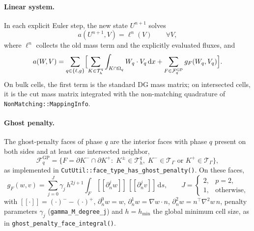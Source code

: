 \documentclass[11pt,a4paper]{article}
\newcommand{\Th}{\mathcal{T}_h}
\newcommand{\TG}{\mathcal{T}_\Gamma}
\newcommand{\FGP}{\mathcal{F}^{\mathrm{GP}}}
\newcommand{\jump}[1]{[\![#1]\!]}
\newcommand{\code}[1]{\nolinkurl{#1}}
\begin{document}
\paragraph{Linear system.}
In each explicit Euler step, the new state $U^{n+1}$ solves
\begin{equation}
  a(U^{n+1},V) = \ell^n(V) \qquad \forall V,
  \label{eq:system}
\end{equation}
where $\ell^n$ collects the old mass term and the explicitly evaluated fluxes, and
\begin{equation}
  a(W,V) = \sum_{q\in\{\ell,g\}}\Bigl[
    \sum_{K\in\Th^q} \int_{K\cap\Omega_q} W_q\cdot V_q \,\mathrm{d}x
    + \sum_{F\in\FGP_q} g_F(W_q,V_q) \Bigr].
  \label{eq:bilinear}
\end{equation}
On bulk cells, the first term is the standard DG mass matrix; on intersected cells, it is the cut
mass matrix integrated with the non-matching quadrature of \code{NonMatching::MappingInfo}.

\paragraph{Ghost penalty.}
The ghost-penalty faces of phase $q$ are the interior faces with phase $q$ present on both sides and
at least one intersected neighbor,
\begin{equation}
  \FGP_q = \bigl\{ F = \partial K^-\cap\partial K^+ :\; K^\pm\in\Th^q,\; K^-\in\TG \text{ or } K^+\in\TG \bigr\},
  \label{eq:gp_faces}
\end{equation}
as implemented in \code{CutUtil::face_type_has_ghost_penalty()}. On these faces,
\begin{equation}
  g_F(w,v) = \sum_{j=0}^{J} \gamma_j\, h^{2j+1} \int_F \jump{\partial_n^j w}\,\jump{\partial_n^j v}\,\mathrm{d}s,
  \qquad
  J = \begin{cases} 2, & p = 2,\\ 1, & \text{otherwise,}\end{cases}
  \label{eq:gp}
\end{equation}
with $\jump{\cdot} = (\cdot)^- - (\cdot)^+$, $\partial_n^0 w = w$, $\partial_n^1 w = \nabla w\cdot n$,
$\partial_n^2 w = n^\top \nabla^2 w\, n$, penalty parameters $\gamma_j$ (\code{gamma_M_degree_j})
and $h = h_{\min}$ the global minimum cell size, as in \code{ghost_penalty_face_integral()}.
\end{document}
